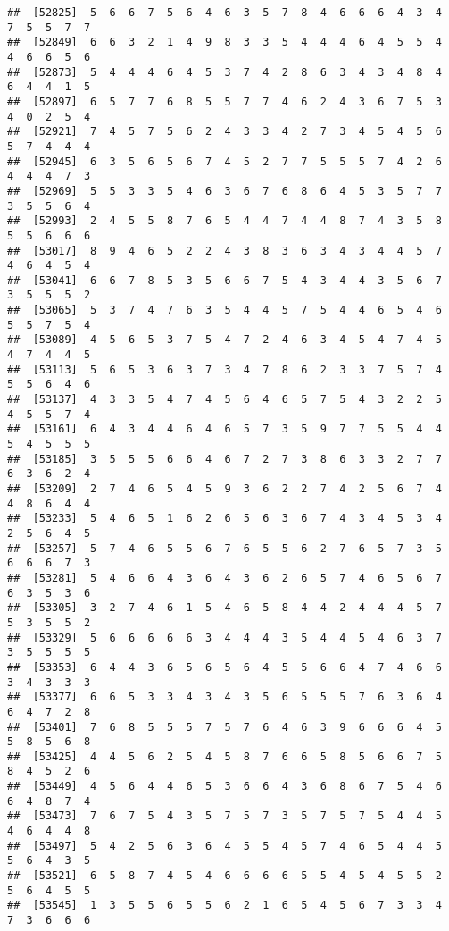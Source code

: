 \documentclass[
]{book}
\begin{document}
\begin{verbatim}
##  [52825]  5  6  6  7  5  6  4  6  3  5  7  8  4  6  6  6  4  3  4  7  5  5  7  7
##  [52849]  6  6  3  2  1  4  9  8  3  3  5  4  4  4  6  4  5  5  4  4  6  6  5  6
##  [52873]  5  4  4  4  6  4  5  3  7  4  2  8  6  3  4  3  4  8  4  6  4  4  1  5
##  [52897]  6  5  7  7  6  8  5  5  7  7  4  6  2  4  3  6  7  5  3  4  0  2  5  4
##  [52921]  7  4  5  7  5  6  2  4  3  3  4  2  7  3  4  5  4  5  6  5  7  4  4  4
##  [52945]  6  3  5  6  5  6  7  4  5  2  7  7  5  5  5  7  4  2  6  4  4  4  7  3
##  [52969]  5  5  3  3  5  4  6  3  6  7  6  8  6  4  5  3  5  7  7  3  5  5  6  4
##  [52993]  2  4  5  5  8  7  6  5  4  4  7  4  4  8  7  4  3  5  8  5  5  6  6  6
##  [53017]  8  9  4  6  5  2  2  4  3  8  3  6  3  4  3  4  4  5  7  4  6  4  5  4
##  [53041]  6  6  7  8  5  3  5  6  6  7  5  4  3  4  4  3  5  6  7  3  5  5  5  2
##  [53065]  5  3  7  4  7  6  3  5  4  4  5  7  5  4  4  6  5  4  6  5  5  7  5  4
##  [53089]  4  5  6  5  3  7  5  4  7  2  4  6  3  4  5  4  7  4  5  4  7  4  4  5
##  [53113]  5  6  5  3  6  3  7  3  4  7  8  6  2  3  3  7  5  7  4  5  5  6  4  6
##  [53137]  4  3  3  5  4  7  4  5  6  4  6  5  7  5  4  3  2  2  5  4  5  5  7  4
##  [53161]  6  4  3  4  4  6  4  6  5  7  3  5  9  7  7  5  5  4  4  5  4  5  5  5
##  [53185]  3  5  5  5  6  6  4  6  7  2  7  3  8  6  3  3  2  7  7  6  3  6  2  4
##  [53209]  2  7  4  6  5  4  5  9  3  6  2  2  7  4  2  5  6  7  4  4  8  6  4  4
##  [53233]  5  4  6  5  1  6  2  6  5  6  3  6  7  4  3  4  5  3  4  2  5  6  4  5
##  [53257]  5  7  4  6  5  5  6  7  6  5  5  6  2  7  6  5  7  3  5  6  6  6  7  3
##  [53281]  5  4  6  6  4  3  6  4  3  6  2  6  5  7  4  6  5  6  7  6  3  5  3  6
##  [53305]  3  2  7  4  6  1  5  4  6  5  8  4  4  2  4  4  4  5  7  5  3  5  5  2
##  [53329]  5  6  6  6  6  6  3  4  4  4  3  5  4  4  5  4  6  3  7  3  5  5  5  5
##  [53353]  6  4  4  3  6  5  6  5  6  4  5  5  6  6  4  7  4  6  6  3  4  3  3  3
##  [53377]  6  6  5  3  3  4  3  4  3  5  6  5  5  5  7  6  3  6  4  6  4  7  2  8
##  [53401]  7  6  8  5  5  5  7  5  7  6  4  6  3  9  6  6  6  4  5  5  8  5  6  8
##  [53425]  4  4  5  6  2  5  4  5  8  7  6  6  5  8  5  6  6  7  5  8  4  5  2  6
##  [53449]  4  5  6  4  4  6  5  3  6  6  4  3  6  8  6  7  5  4  6  6  4  8  7  4
##  [53473]  7  6  7  5  4  3  5  7  5  7  3  5  7  5  7  5  4  4  5  4  6  4  4  8
##  [53497]  5  4  2  5  6  3  6  4  5  5  4  5  7  4  6  5  4  4  5  5  6  4  3  5
##  [53521]  6  5  8  7  4  5  4  6  6  6  6  5  5  4  5  4  5  5  2  5  6  4  5  5
##  [53545]  1  3  5  5  6  5  5  6  2  1  6  5  4  5  6  7  3  3  4  7  3  6  6  6

\end{verbatim}
\end{document}
